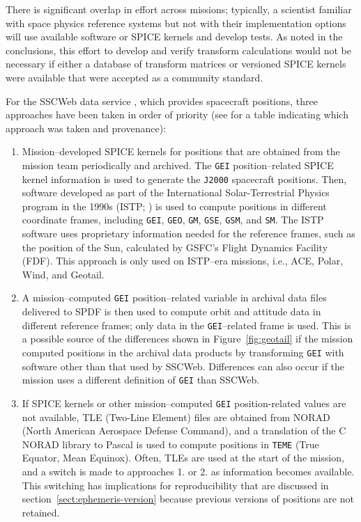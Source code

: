 \documentclass[draft]{agujournal2019}
\begin{document}
There is significant overlap in effort across missions; typically, a scientist familiar with space physics reference systems but not with their implementation options will use available software or SPICE kernels and develop tests. As noted in the conclusions, this effort to develop and verify transform calculations would not be necessary if either a database of transform matrices or versioned SPICE kernels were available that were accepted as a community standard. 

For the SSCWeb data service \cite{SSCWeb}, which provides spacecraft positions, three approaches have been taken in order of priority (see  for a table indicating which approach was taken and provenance):

\begin{enumerate}
    \parskip 0.1in 

    \item Mission--developed SPICE kernels for positions that are obtained from the mission team periodically and archived. The \texttt{GEI} position--related SPICE kernel information is used to generate the \texttt{J2000} spacecraft positions. Then, software developed as part of the International Solar-Terrestrial Physics program in the 1990s (ISTP; ) is used to compute positions in different coordinate frames, including \texttt{GEI}, \texttt{GEO}, \texttt{GM}, \texttt{GSE}, \texttt{GSM}, and \texttt{SM}. The ISTP software uses proprietary information needed for the reference frames, such as the position of the Sun, calculated by GSFC's Flight Dynamics Facility (FDF).  This approach is only used on ISTP--era missions, i.e., ACE, Polar, Wind, and Geotail.

    \item A mission--computed \texttt{GEI} position--related variable in archival data files delivered to SPDF is then used to compute orbit and attitude data in different reference frames; only data in the \texttt{GEI}--related frame is used. This is a possible source of the differences shown in Figure~\ref{fig:geotail} if the mission computed positions in the archival data products by transforming \texttt{GEI} with software other than that used by SSCWeb. Differences can also occur if the mission uses a different definition of \texttt{GEI} than SSCWeb.

    \item If SPICE kernels or other mission--computed  \texttt{GEI} position-related values are not available, TLE (Two-Line Element) files are obtained from NORAD (North American Aerospace Defense Command), and a translation of the C NORAD library to Pascal \cite{NORADSGP4c} is used to compute positions in \texttt{TEME} (True Equator, Mean Equinox). Often, TLEs are used at the start of the mission, and a switch is made to approaches 1. or 2. as information becomes available. This switching has implications for reproducibility that are discussed in section~\ref{sect:ephemeris-version} because previous versions of positions are not retained.
     

\end{enumerate}
\end{document}
